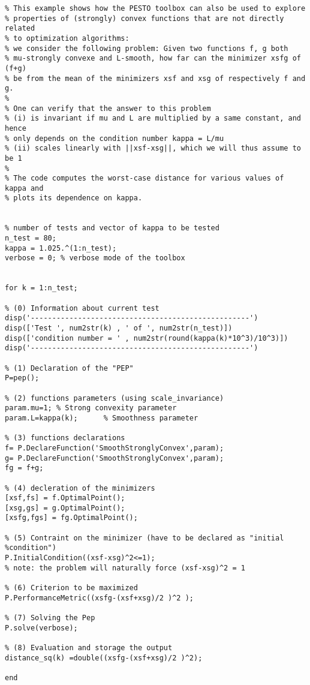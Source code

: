 \documentclass[11pt,a4paper]{article}
\begin{document}
\begin{lstlisting}
% This example shows how the PESTO toolbox can also be used to explore
% properties of (strongly) convex functions that are not directly related
% to optimization algorithms:
% we consider the following problem: Given two functions f, g both
% mu-strongly convexe and L-smooth, how far can the minimizer xsfg of (f+g) 
% be from the mean of the minimizers xsf and xsg of respectively f and g. 
%
% One can verify that the answer to this problem 
% (i) is invariant if mu and L are multiplied by a same constant, and hence
% only depends on the condition number kappa = L/mu
% (ii) scales linearly with ||xsf-xsg||, which we will thus assume to be 1
%
% The code computes the worst-case distance for various values of kappa and
% plots its dependence on kappa.


% number of tests and vector of kappa to be tested
n_test = 80;
kappa = 1.025.^(1:n_test);
verbose = 0; % verbose mode of the toolbox


for k = 1:n_test;

% (0) Information about current test    
disp('---------------------------------------------------')
disp(['Test ', num2str(k) , ' of ', num2str(n_test)])
disp(['condition number = ' , num2str(round(kappa(k)*10^3)/10^3)])
disp('---------------------------------------------------')

% (1) Declaration of the "PEP"
P=pep();

% (2) functions parameters (using scale_invariance)
param.mu=1;	% Strong convexity parameter
param.L=kappa(k);      % Smoothness parameter

% (3) functions declarations
f= P.DeclareFunction('SmoothStronglyConvex',param);
g= P.DeclareFunction('SmoothStronglyConvex',param);
fg = f+g;

% (4) decleration of the minimizers
[xsf,fs] = f.OptimalPoint();
[xsg,gs] = g.OptimalPoint();
[xsfg,fgs] = fg.OptimalPoint();

% (5) Contraint on the minimizer (have to be declared as "initial
%condition")
P.InitialCondition((xsf-xsg)^2<=1);
% note: the problem will naturally force (xsf-xsg)^2 = 1

% (6) Criterion to be maximized
P.PerformanceMetric((xsfg-(xsf+xsg)/2 )^2 ); 

% (7) Solving the Pep
P.solve(verbose);

% (8) Evaluation and storage the output
distance_sq(k) =double((xsfg-(xsf+xsg)/2 )^2); 

end



\end{lstlisting}
\end{document}
